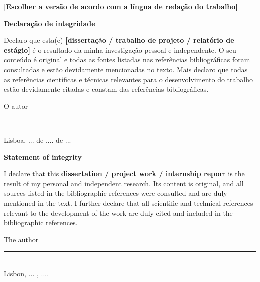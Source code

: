 \begin{center}
\textbf{[Escolher a versão de acordo com a língua de redação do trabalho]} %
\end{center}

\begin{center}
    \textbf{Declaração de integridade}
\end{center}

Declaro que esta(e) \textbf{[dissertação / trabalho de projeto / relatório de estágio]} é o resultado da minha investigação pessoal e independente. O seu conteúdo é original e todas as fontes listadas nas referências bibliográficas foram consultadas e estão devidamente mencionadas no texto. Mais declaro que todas as referências científicas e técnicas relevantes para o desenvolvimento do trabalho estão devidamente citadas e constam das referências bibliográficas.

\begin{center}
O autor
\\[2em]

\rule{.5\textwidth}{1pt}
\\[.5em]
\fontsize{10}{12.2}
\selectfont
Lisboa, ...  de .... de ...
\end{center}

\vspace{5em}
\begin{center}
    \textbf{Statement of integrity}
\end{center}

I declare that this \textbf{dissertation / project work / internship repor}t is the result of my personal and independent research. Its content is original, and all sources listed in the bibliographic references were consulted and are duly mentioned in the text. I further declare that all scientific and technical references relevant to the development of the work are duly cited and included in the bibliographic references.

\begin{center}
The author
\\[2em]

\rule{.5\textwidth}{1pt}
\\[.5em]
\fontsize{10}{12.2}
\selectfont
Lisbon, ...  , ....
\end{center}
